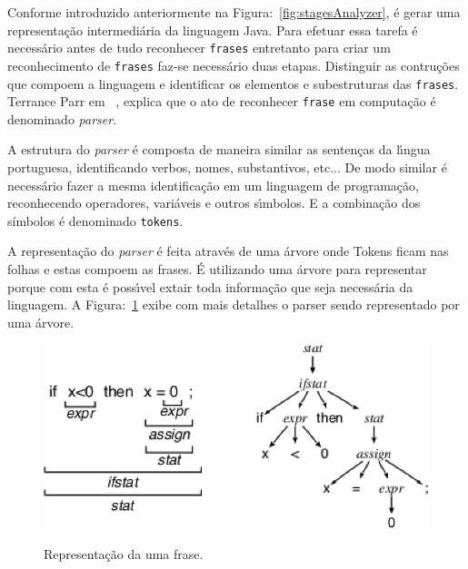 Conforme introduzido anteriormente na Figura:~\ref{fig:stagesAnalyzer}, \'{e} gerar uma representa\c{c}\~{a}o intermedi\'{a}ria da linguagem Java. Para efetuar essa tarefa é necessário antes de tudo reconhecer \texttt{frases} entretanto para criar um reconhecimento de \texttt{frases} faz-se necessário duas etapas. Distinguir as contruções que compoem a linguagem e identificar os elementos e subestruturas das \texttt{frases}. Terrance Parr em ~\cite{Parr:2009:LIP:1823613}, explica que o ato de reconhecer \texttt{frase} em computa\c{c}\~{a}o é denominado \textit{parser}.

A estrutura do \textit{parser} \'{e} composta de maneira similar as senten\c{c}as da l\'{\i}ngua portuguesa, identificando verbos, nomes, substantivos, etc... De modo similar \'{e} necess\'{a}rio fazer a mesma identifica\c{c}\~{a}o em um linguagem de programa\c{c}\~{a}o, reconhecendo operadores, vari\'{a}veis e outros s\'{\i}mbolos. E a combina\c{c}\~{a}o dos s\'{i}mbolos \'{e} denominado \texttt{tokens}.

A representa\c{c}\~{a}o do \textit{parser} \'{e} feita atrav\'{e}s de uma árvore onde Tokens ficam nas folhas e estas  compoem as frases. \'{E} utilizando uma \'{a}rvore para representar porque com esta \'{e} poss\'{\i}vel extair toda informa\c{c}\~{a}o que seja necess\'{a}ria da linguagem. A Figura:~\ref{fig:treeParse} exibe com mais detalhes o parser sendo representado por uma \'{a}rvore.

\begin{figure}[h]
	\center
	\includegraphics[scale=0.9]{Imagens/treeParser}
	\label{fig:treeParse}
	\caption{Representa\c{c}\~{a}o da uma frase.}
\end{figure}



